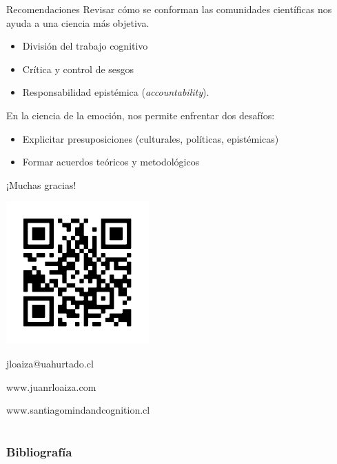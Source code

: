 \documentclass[%
            9pt,
                spanish, %
                    ignorenonframetext,
                aspectratio=169, %
        ]{beamer}
\providecommand{\tightlist}{}
\begin{document}
\begin{frame}{Recomendaciones}
\label{recomendaciones-2}
Revisar cómo se conforman las comunidades científicas nos ayuda a una
ciencia más objetiva. \pause

\begin{itemize}
\tightlist
\item
  División del trabajo cognitivo \pause
\item
  Crítica y control de sesgos \pause
\item
  Responsabilidad epistémica (\emph{accountability}). \pause
\end{itemize}

En la ciencia de la emoción, nos permite enfrentar dos desafíos: \pause

\begin{itemize}
\tightlist
\item
  Explicitar presuposiciones (culturales, políticas, epistémicas) \pause
\item
  Formar acuerdos teóricos y metodológicos
\end{itemize}
\end{frame}



\begin{frame}

    \centering
    {\Large
    ¡Muchas gracias!}

      \includegraphics{qr_juanrloaizacom.pdf}

    jloaiza@uahurtado.cl

    www.juanrloaiza.com

    www.santiagomindandcognition.cl

\end{frame}

\section{}
\begin{frame}[allowframebreaks]
\frametitle{Bibliografía}
\printbibliography
\end{frame}
\end{document}
